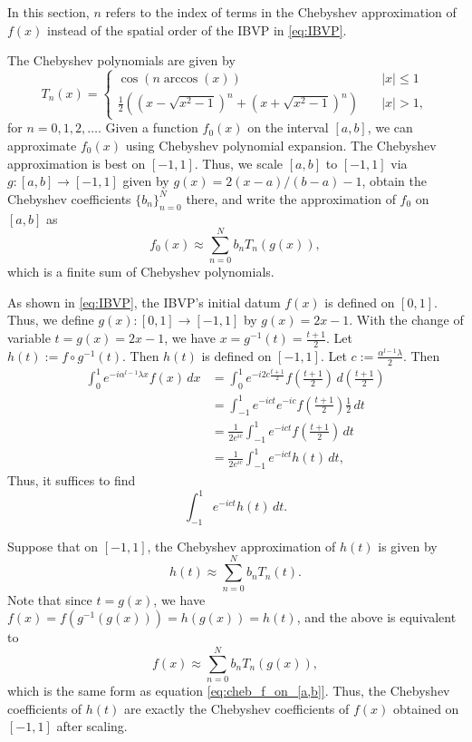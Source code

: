\documentclass[12pt, oneside, a4paper]{article}
\begin{document}
In this section, $n$ refers to the index of terms in the Chebyshev approximation of $f(x)$ instead of the spatial order of the IBVP in \eqref{eq:IBVP}.

The Chebyshev polynomials are given by
\[
    T_n(x) =
\begin{cases}
    \cos(n \arccos(x))&\quad\mbox{$|x|\leq 1$}\\
    \frac{1}{2}\left((x-\sqrt{x^2-1})^n + (x+\sqrt{x^2-1})^n\right)&\quad\mbox{$|x|>1$},
\end{cases}    
\]
for $n=0,1,2,\ldots$. Given a function $f_0(x)$ on the interval $[a,b]$, we can approximate $f_0(x)$ using Chebyshev polynomial expansion. The Chebyshev approximation is best on $[-1,1]$. Thus, we scale $[a,b]$ to $[-1,1]$ via $g:[a,b]\to [-1,1]$ given by $g(x)=2(x-a)/(b-a)-1$, obtain the Chebyshev coefficients $\{b_n\}_{n=0}^N$ there, and write the approximation of $f_0$ on $[a,b]$ as
\begin{equation}\label{eq:cheb_f_on_[a,b]}
    f_0(x)\approx \sum_{n=0}^N b_n T_n(g(x)),
\end{equation}
which is a finite sum of Chebyshev polynomials.

As shown in \eqref{eq:IBVP}, the IBVP's initial datum $f(x)$ is defined on $[0,1]$. Thus, we define $g(x):[0,1]\to [-1,1]$ by $g(x)=2x-1$. With the change of variable $t=g(x)=2x-1$, we have $x=g^{-1}(t)=\frac{t+1}{2}$. Let $h(t) := f\circ g^{-1}(t)$. Then $h(t)$ is defined on $[-1,1]$. Let $c:=\frac{\alpha^{l-1}\lambda}{2}$. Then
\begin{align*}
    \int_0^1 e^{-i\alpha^{l-1}\lambda x}f(x)\,dx &= \int_0^1 e^{-i2c\frac{t+1}{2}}f\left(\frac{t+1}{2}\right)\,d\left(\frac{t+1}{2}\right)\\
    &= \int_{-1}^1 e^{-ict}e^{-ic}f\left(\frac{t+1}{2}\right)\frac{1}{2}\,dt\\
    &= \frac{1}{2e^{ic}}\int_{-1}^1 e^{-ict} f\left(\frac{t+1}{2}\right)\,dt\\
    &= \frac{1}{2e^{ic}}\int_{-1}^1 e^{-ict} h(t)\,dt,
\end{align*}
Thus, it suffices to find 
\[\int_{-1}^1 e^{-ict} h(t)\,dt.\]

Suppose that on $[-1,1]$, the Chebyshev approximation of $h(t)$ is given by
\[h(t) \approx \sum_{n=0}^N b_n T_n(t).\]
Note that since $t=g(x)$, we have $f(x) = f(g^{-1}(g(x))) = h(g(x)) = h(t)$, and the above is equivalent to
\[f(x) \approx \sum_{n=0}^N b_n T_n(g(x)),\]
which is the same form as equation \eqref{eq:cheb_f_on_[a,b]}.
Thus, the Chebyshev coefficients of $h(t)$ are exactly the Chebyshev coefficients of $f(x)$ obtained on $[-1,1]$ after scaling. 
\end{document}
